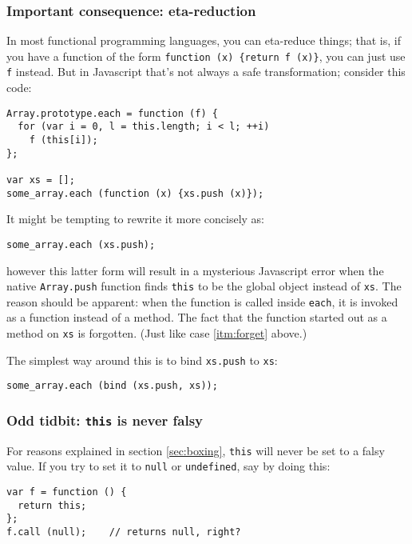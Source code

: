 \documentclass{article}
\begin{document}
\subsubsection {Important consequence: eta-reduction}
      In most functional programming languages, you can eta-reduce things; that is, if you have a function of the form \verb|function (x) {return f (x)}|, you can just use \verb|f| instead.
      But in Javascript that's not always a safe transformation; consider this code:

\begin{verbatim}
Array.prototype.each = function (f) {
  for (var i = 0, l = this.length; i < l; ++i)
    f (this[i]);
};

var xs = [];
some_array.each (function (x) {xs.push (x)});
\end{verbatim}

      It might be tempting to rewrite it more concisely as:

\begin{verbatim}
some_array.each (xs.push);
\end{verbatim}

      \noindent however this latter form will result in a mysterious Javascript error when the native \verb|Array.push| function finds \verb|this| to be the global object instead of \verb|xs|.
      The reason should be apparent: when the function is called inside \verb|each|, it is invoked as a function instead of a method. The fact that the function started out as a method on
      \verb|xs| is forgotten. (Just like case \ref{itm:forget} above.)

      The simplest way around this is to bind \verb|xs.push| to \verb|xs|:

\begin{verbatim}
some_array.each (bind (xs.push, xs));
\end{verbatim}

\subsubsection {Odd tidbit: {\tt this} is never falsy}
      \label{sec:this-is-never-falsy}
      For reasons explained in section \ref{sec:boxing}, {\tt this} will never be set to a falsy value. If you try to set it to {\tt null} or {\tt undefined}, say by doing this:

\begin{verbatim}
var f = function () {
  return this;
};
f.call (null);    // returns null, right?
\end{verbatim}
\end{document}

